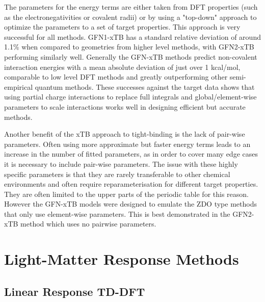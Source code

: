 The parameters for the energy terms are either taken from DFT properties (such
as the electronegativities or covalent radii) or by using a "top-down" approach
to optimize the parameters to a set of target properties. This approach is very 
successful for all methods. GFN1-xTB  has a standard relative deviation of around
1.1\% when compared to geometries from higher level methods, with GFN2-xTB performing
similarly well. Generally the GFN-xTB methods predict non-covalent interaction energies
with a mean absolute deviation of just over 1 kcal/mol, comparable to low level 
DFT methods and greatly outperforming other semi-empirical quantum methods. These
successes against the target data shows that using partial charge interactions to
replace full integrals and global/element-wise parameters to scale interactions 
works well in designing efficient but accurate methods.

Another benefit of the xTB approach to tight-binding is the lack of pair-wise parameters.
Often using more approximate but faster energy terms leads to an increase in the
number of fitted parameters, as in order to cover many edge cases it is necessary
to include pair-wise parameters. The issue with these highly specific parameters 
is that they are rarely transferable to other chemical environments and often require
reparameterisation for different target properties. They are often limited to the 
upper parts of the periodic table for this reason. However the GFN-xTB models were
designed to emulate the ZDO type methods that only use element-wise parameters.
This is best demonstrated in the GFN2-xTB method which uses no pairwise parameters.

\section{Light-Matter Response Methods}
\label{sec:response_theories}

\subsection{Linear Response TD-DFT}
\label{subsec:tddft}

